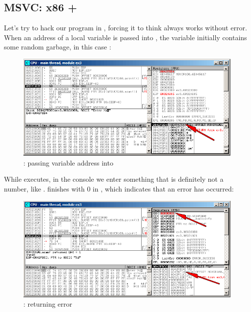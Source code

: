 \clearpage
\subsection{MSVC: x86 + \olly}

Let's try to hack our program in \olly, forcing it to think \scanf always works without error.
When an address of a local variable is passed into \scanf,
the variable initially contains some random garbage, in this case :

\begin{figure}[H]
\centering
\includegraphics[scale=\FigScale]{patterns/04_scanf/3_checking_retval/olly_1.png}
\caption{\olly: passing variable address into \scanf}
\label{fig:scanf_ex3_olly_1}
\end{figure}

\clearpage
While \scanf executes, in the console we enter something that is definitely not a number, like .
\scanf finishes with 0 in \EAX, which indicates that an error has occurred:

\begin{figure}[H]
\centering
\includegraphics[scale=\FigScale]{patterns/04_scanf/3_checking_retval/olly_2.png}
\caption{\olly: \scanf returning error}
\label{fig:scanf_ex3_olly_2}
\end{figure}

